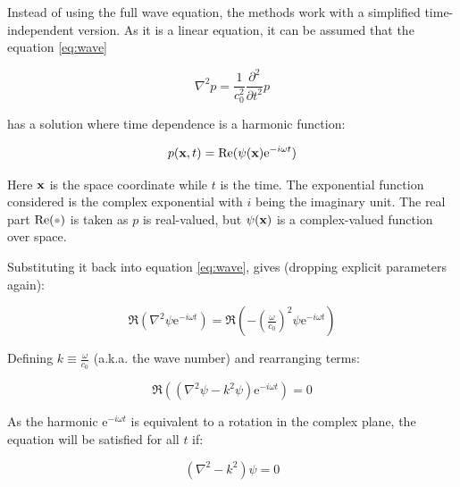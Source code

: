 
Instead of using the full wave equation, the methods work with a simplified
time-independent version. As it is a linear equation, it can be assumed that the
equation \ref{eq:wave}

\[ \nabla^2 p = \frac{1}{c^2_0}\frac{\partial^2}{\partial t^2} p \]

has a solution where time dependence is a harmonic function:

\begin{equation}
\label{eq:pressurepsi}
p(\mathrm{\mathbf{x}},t) = \operatorname{Re}(\psi(\mathrm{\mathbf{x}})\mathrm{e}^{-i\omega t})
\end{equation}

Here $\mathrm{\mathbf{x}}$ is the space coordinate while $t$ is the time. The exponential
function considered is the complex exponential with $i$ being the imaginary unit.
The real part $\Re(\parm)$ is taken as $p$ is real-valued, but $\psi(\mathrm{\mathbf{x}})$
is a complex-valued function over space.

Substituting it back into equation \ref{eq:wave}, gives
(dropping explicit parameters again):

\[ \Re(\nabla^2 \psi \mathrm{e}^{-i\omega t}) =
\Re(-(\tfrac{\omega}{c_0})^2 \psi \mathrm{e}^{-i\omega t})\]


Defining $k \equiv \tfrac{\omega}{c_0} $ (a.k.a. the wave number) and rearranging
terms:

\[ \Re((\nabla^2 \psi -k^2 \psi) \mathrm{e}^{-i\omega t}) = 0\]

As the harmonic $\mathrm{e}^{-i\omega t}$ is equivalent to a rotation in the complex
plane, the equation will be satisfied for all $t$ if:

\begin{equation}
\label{eq:helmholtz}
(\nabla^2 -k^2)\psi = 0 
\end{equation}

% 
% 
% 
% 
% 
% 

